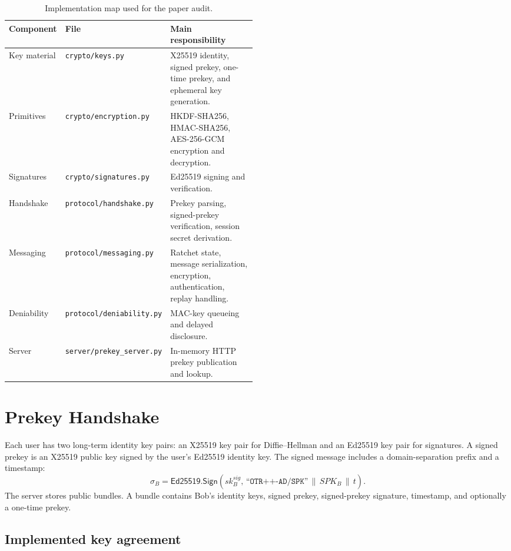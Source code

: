 \documentclass[11pt]{article}
\begin{document}
\begin{table}[t]
\centering
\begin{tabular}{@{}llp{0.49\linewidth}@{}}
\toprule
Component & File & Main responsibility \\
\midrule
Key material & \texttt{crypto/keys.py} & X25519 identity, signed prekey, one-time prekey, and ephemeral key generation. \\
Primitives & \texttt{crypto/encryption.py} & HKDF-SHA256, HMAC-SHA256, AES-256-GCM encryption and decryption. \\
Signatures & \texttt{crypto/signatures.py} & Ed25519 signing and verification. \\
Handshake & \texttt{protocol/handshake.py} & Prekey parsing, signed-prekey verification, session secret derivation. \\
Messaging & \texttt{protocol/messaging.py} & Ratchet state, message serialization, encryption, authentication, replay handling. \\
Deniability & \texttt{protocol/deniability.py} & MAC-key queueing and delayed disclosure. \\
Server & \texttt{server/prekey\_server.py} & In-memory HTTP prekey publication and lookup. \\
\bottomrule
\end{tabular}
\caption{Implementation map used for the paper audit.}
\label{tab:implementation-map}
\end{table}

\section{Prekey Handshake}
\label{sec:handshake}

Each user has two long-term identity key pairs: an X25519 key pair for Diffie--Hellman and an Ed25519 key pair for signatures. A signed prekey is an X25519 public key signed by the user's Ed25519 identity key. The signed message includes a domain-separation prefix and a timestamp:
\[
  \sigma_B = \mathsf{Ed25519.Sign}(sk^{sig}_B,\,
  \texttt{``OTR++-AD/SPK''} \,\|\, SPK_B \,\|\, t).
\]
The server stores public bundles. A bundle contains Bob's identity keys, signed prekey, signed-prekey signature, timestamp, and optionally a one-time prekey.

\subsection{Implemented key agreement}
\end{document}
